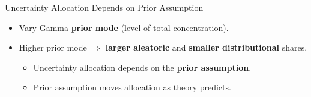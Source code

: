 \begin{frame}{Uncertainty Allocation Depends on Prior Assumption}
\label{frm:prior-mode-results}
\begin{itemize}
\setlength{\itemsep}{2mm}
\item Vary Gamma \textbf{prior mode} (level of total concentration).%
\end{itemize}
\begin{center}
\small
\renewcommand{\arraystretch}{1.0}
\setlength{\tabcolsep}{3pt}
\scalebox{0.9}{}
\end{center}
\begin{itemize}
\setlength{\itemsep}{2mm}
\item Higher prior mode $\Rightarrow$ \textbf{larger aleatoric} and \textbf{smaller distributional} shares.
\begin{itemize}
\item Uncertainty allocation depends on the \textbf{prior assumption}.
\item Prior assumption moves allocation as theory predicts. %
\end{itemize}
\end{itemize}
\end{frame}

